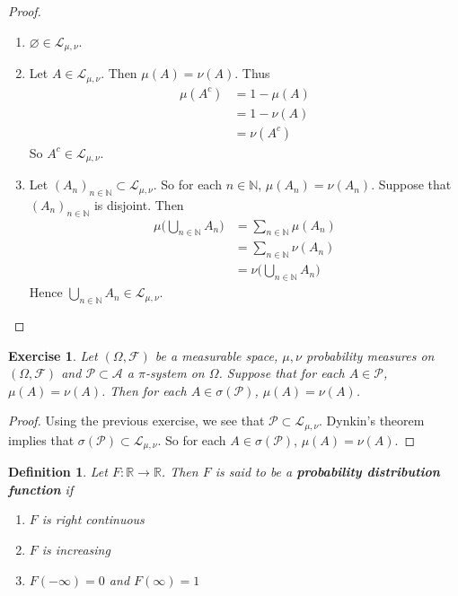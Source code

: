 \documentclass[12pt]{amsart}
\newtheorem{defn}[thm]{Definition}
\newtheorem{ex}[thm]{Exercise}
\newcommand{\sig}{\sigma}
\newcommand{\Om}{\Omega}
\newcommand{\N}{\mathbb{N}}
\newcommand{\R}{\mathbb{R}}
\newcommand{\MA}{\mathcal{A}}
\newcommand{\MF}{\mathcal{F}}
\newcommand{\ML}{\mathcal{L}}
\newcommand{\MP}{\mathcal{P}}
\begin{document}
\begin{proof}\
\begin{enumerate}
\item $\varnothing \in \ML_{\mu, \nu}$.
\item Let $A \in \ML_{\mu, \nu}$. Then $\mu(A) = \nu(A)$. Thus 
\begin{align*}
\mu(A^c) 
&= 1-\mu(A) \\
&= 1 -\nu(A) \\
&= \nu(A^c)
\end{align*}
So $A^c \in \ML_{\mu, \nu}$. 
\item Let $(A_n)_{n \in \N} \subset \ML_{\mu, \nu}$. So for each $n \in \N$, $\mu(A_n) = \nu(A_n)$.  Suppose that $(A_n)_{n \in \N}$ is disjoint. Then 
\begin{align*}
\mu\bigg(\bigcup_{n \in \N} A_n\bigg) 
&= \sum_{n \in \N} \mu(A_n) \\
&= \sum_{n \in \N} \nu(A_n) \\
&= \nu\bigg(\bigcup_{n \in \N} A_n\bigg) 
\end{align*}
Hence $\bigcup_{n \in \N} A_n \in \ML_{\mu, \nu}$.
\end{enumerate}
\end{proof}

\begin{ex}
Let $(\Om, \MF)$ be a measurable space, $\mu, \nu$ probability measures on $(\Om, \MF)$ and $\MP \subset \MA$ a $\pi$-system on $\Om$. Suppose that for each $A \in \MP$, $\mu(A) = \nu(A)$. Then for each $A \in \sig(\MP)$, $\mu(A) = \nu(A)$.
\end{ex}

\begin{proof}
Using the previous exercise, we see that $\MP \subset \ML_{\mu, \nu}$. Dynkin's theorem implies that $\sig(\MP) \subset \ML_{\mu, \nu}$. So for each $A \in \sig(\MP)$, $\mu(A) = \nu(A)$.
\end{proof}








\begin{defn}
Let $F: \R \rightarrow \R$. Then $F$ is said to be a \textbf{probability distribution function} if 
\begin{enumerate}
\item $F$ is right continuous
\item $F$ is increasing
\item $F(-\infty)  = 0$ and $F(\infty)  = 1$
\end{enumerate}
\end{defn}
\end{document}
